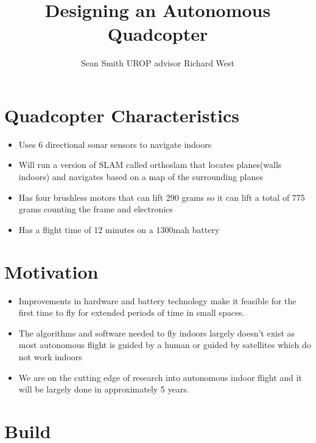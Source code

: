 \documentclass{lposter}
\author{Sean Smith UROP advisor Richard West}
\title{Designing an Autonomous Quadcopter}
\theoremstyle{plain}
\theoremstyle{definition}
\begin{document}
\begin{poster}



\section{Quadcopter Characteristics}

\begin{itemize}
\item Uses 6 directional sonar sensors to navigate indoors
\item Will run a version of SLAM called orthoslam that locates planes(walls indoors) and navigates based on a map of the surrounding planes
\item Has four brushless motors that can lift 290 grams so it can lift a total of 775 grams counting the frame and electronics
\item Has a flight time of 12 minutes on a 1300mah battery
\end{itemize}

\section{Motivation}

\begin{itemize}
\item Improvements in hardware and battery technology make it feasible for the first time to fly for extended periods of time in small spaces.
\item The algorithms and software needed to fly indoors largely doesn't exist as most autonomous flight is guided by a human or guided by satellites which do not work indoors
\item We are on the cutting edge of research into autonomous indoor flight and it will be largely done in approximately 5 years.  

\end{itemize}

\section{Build}


\end{poster}
\end{document}
